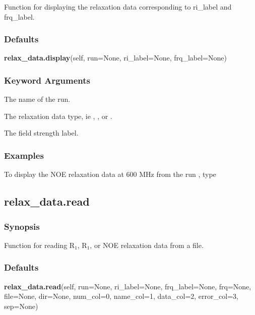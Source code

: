 Function for displaying the relaxation data corresponding to ri\_label and frq\_label.

\subsubsection{Defaults}

\textsf{\textbf{relax\_data.display}(self, run=None, ri\_label=None, frq\_label=None)}


\subsubsection{Keyword Arguments}


  The name of the run.

  The relaxation  data type, ie 
, 
, or 
.

  The field strength label.

\subsubsection{Examples}

To display  the NOE relaxation  data at 600 MHz from the run 
, type




\newpage

\subsection{relax\_data.read}


\subsubsection{Synopsis}

Function for reading R$_1$, R$_1$, or NOE relaxation data from a file.

\subsubsection{Defaults}

\textsf{\textbf{relax\_data.read}(self, run=None, ri\_label=None, frq\_label=None, frq=None, file=None, dir=None, num\_col=0, name\_col=1, data\_col=2, error\_col=3, sep=None)}


